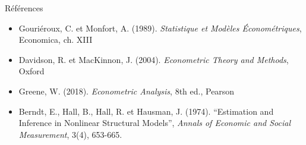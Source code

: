 \documentclass[11pt,aspectratio=169]{beamer}
\begin{document}
\begin{frame}{Références}

\begin{itemize}

\item Gouriéroux, C. et Monfort, A. (1989). \textit{Statistique et Modèles Économétriques}, Economica, ch. XIII\newline

\item Davidson, R. et MacKinnon, J. (2004). \textit{Econometric Theory and Methods}, Oxford\newline

\item Greene, W. (2018). \textit{Econometric Analysis}, 8th ed., Pearson\newline

\item Berndt, E., Hall, B., Hall, R. et Hausman, J. (1974). ``Estimation and Inference in Nonlinear Structural Models'', \textit{Annals of Economic and Social Measurement}, 3(4), 653-665.

\end{itemize}

\end{frame}
\end{document}
